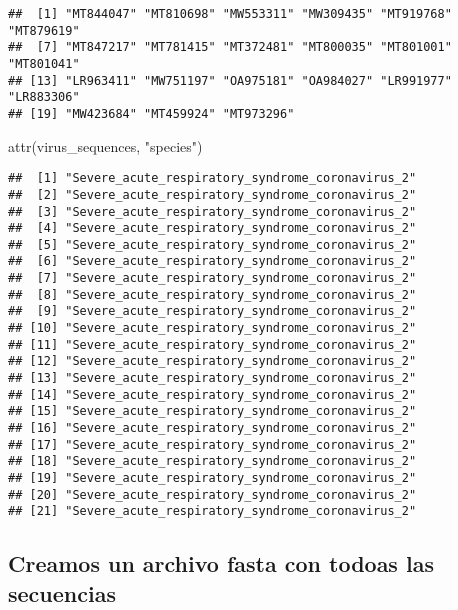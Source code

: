 \documentclass[
]{article}
\newenvironment{Shaded}{\begin{snugshade}}{\end{snugshade}}
\newcommand{\FunctionTok}[1]{\textcolor[rgb]{0.00,0.00,0.00}{#1}}
\newcommand{\NormalTok}[1]{#1}
\newcommand{\StringTok}[1]{\textcolor[rgb]{0.31,0.60,0.02}{#1}}
\begin{document}
\begin{verbatim}
##  [1] "MT844047" "MT810698" "MW553311" "MW309435" "MT919768" "MT879619"
##  [7] "MT847217" "MT781415" "MT372481" "MT800035" "MT801001" "MT801041"
## [13] "LR963411" "MW751197" "OA975181" "OA984027" "LR991977" "LR883306"
## [19] "MW423684" "MT459924" "MT973296"
\end{verbatim}

\begin{Shaded}
\begin{Highlighting}[]
\FunctionTok{attr}\NormalTok{(virus\_sequences, }\StringTok{"species"}\NormalTok{)}
\end{Highlighting}
\end{Shaded}

\begin{verbatim}
##  [1] "Severe_acute_respiratory_syndrome_coronavirus_2"
##  [2] "Severe_acute_respiratory_syndrome_coronavirus_2"
##  [3] "Severe_acute_respiratory_syndrome_coronavirus_2"
##  [4] "Severe_acute_respiratory_syndrome_coronavirus_2"
##  [5] "Severe_acute_respiratory_syndrome_coronavirus_2"
##  [6] "Severe_acute_respiratory_syndrome_coronavirus_2"
##  [7] "Severe_acute_respiratory_syndrome_coronavirus_2"
##  [8] "Severe_acute_respiratory_syndrome_coronavirus_2"
##  [9] "Severe_acute_respiratory_syndrome_coronavirus_2"
## [10] "Severe_acute_respiratory_syndrome_coronavirus_2"
## [11] "Severe_acute_respiratory_syndrome_coronavirus_2"
## [12] "Severe_acute_respiratory_syndrome_coronavirus_2"
## [13] "Severe_acute_respiratory_syndrome_coronavirus_2"
## [14] "Severe_acute_respiratory_syndrome_coronavirus_2"
## [15] "Severe_acute_respiratory_syndrome_coronavirus_2"
## [16] "Severe_acute_respiratory_syndrome_coronavirus_2"
## [17] "Severe_acute_respiratory_syndrome_coronavirus_2"
## [18] "Severe_acute_respiratory_syndrome_coronavirus_2"
## [19] "Severe_acute_respiratory_syndrome_coronavirus_2"
## [20] "Severe_acute_respiratory_syndrome_coronavirus_2"
## [21] "Severe_acute_respiratory_syndrome_coronavirus_2"
\end{verbatim}

\hypertarget{creamos-un-archivo-fasta-con-todoas-las-secuencias}{%
\subsection{Creamos un archivo fasta con todoas las
secuencias}\label{creamos-un-archivo-fasta-con-todoas-las-secuencias}}
\end{document}
